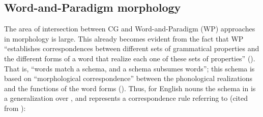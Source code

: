 \documentclass[output=paper]{langscibook}
\begin{document}
\subsection{Word-and-Paradigm morphology}\label{wiemer:4.2}

The area of intersection between CG and Word-and-Paradigm (WP) approaches in morphology is large. This already becomes evident from the fact that WP “establishes correspondences between different sets of grammatical properties and the different forms of a word that realize each one of these sets of properties” (\citealt[31]{FabregasScalise2012}). That is, “words match a schema, and a schema subsumes words”; this schema is based on ``morphological correspondence'' between the phonological realizations and the functions of the word forms (\citealt[46--47]{HaspelmathSims2010}). Thus, for English nouns the schema in  is a generalization over , and  represents a correspondence rule referring to  (cited from \citealt[46--47]{HaspelmathSims2010}):
\end{document}
